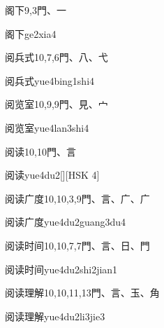 \begin{entry}{阁下}{9,3}{⾨、⼀}
  \begin{phonetics}{阁下}{ge2xia4}
  \end{phonetics}
\end{entry}

\begin{entry}{阅兵式}{10,7,6}{⾨、⼋、⼷}
  \begin{phonetics}{阅兵式}{yue4bing1shi4}
  \end{phonetics}
\end{entry}

\begin{entry}{阅览室}{10,9,9}{⾨、⾒、⼧}
  \begin{phonetics}{阅览室}{yue4lan3shi4}
  \end{phonetics}
\end{entry}

\begin{entry}{阅读}{10,10}{⾨、⾔}
  \begin{phonetics}{阅读}{yue4du2}[][HSK 4]
  \end{phonetics}
\end{entry}

\begin{entry}{阅读广度}{10,10,3,9}{⾨、⾔、⼴、⼴}
  \begin{phonetics}{阅读广度}{yue4du2guang3du4}
  \end{phonetics}
\end{entry}

\begin{entry}{阅读时间}{10,10,7,7}{⾨、⾔、⽇、⾨}
  \begin{phonetics}{阅读时间}{yue4du2shi2jian1}
  \end{phonetics}
\end{entry}

\begin{entry}{阅读理解}{10,10,11,13}{⾨、⾔、⽟、⾓}
  \begin{phonetics}{阅读理解}{yue4du2li3jie3}
  \end{phonetics}
\end{entry}

